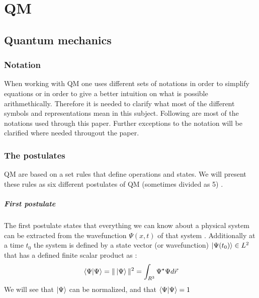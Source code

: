 \documentclass[../master_thesis.tex]{subfiles}
\begin{document}
\chapter{\ac{QM}}
\section{Quantum mechanics}
\subsection{Notation}
When working with \ac{QM} one uses different sets of notations in order to
simplify equations or in order to give a better intuition on what is possible
arithmethically. Therefore it is needed to clarify what most of the different
symbols and representations mean in this subject. Following are most of the
 notations used through this paper. Further exceptions to the notation will be
 clarified where needed througout the paper.
\subsection{The postulates}

\ac{QM} are based on a set rules that define operations and states. We will
present these rules as six different postulates of \ac{QM} (sometimes divided
as 5)
\cite{Atkins:2011, Cohen:1973}.
\paragraph{First postulate}
The first postulate states that everything we can know about a physical system
can be extracted from the wavefunction $\Psi(x, t)$ of that system
\cite{Atkins:2011}. Additionally at a time $t_0$ the system is defined by
a state vector (or wavefunction) $\ket{\Psi(t_0)}\in L^2$ that has a defined
finite scalar product as \cite{Cohen:1973}:
\begin{equation}
  \braket{\Psi|\Psi} = \|\ket{\Psi}\|^2 =  \int_{R^3}\Psi^\star\Psi d\vec{r}
\end{equation}
We will see that $\ket{\Psi}$ can be normalized, and that
$\braket{\Psi|\Psi} = 1$
\end{document}
